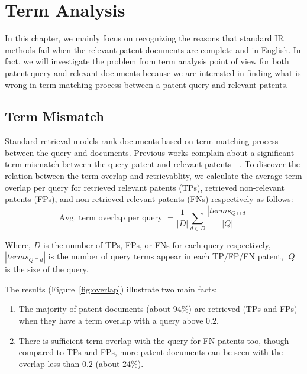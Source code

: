 \chapter{Term Analysis}
\label{cha:analysis}
In this chapter, we mainly focus on recognizing the reasons that standard IR methods fail when the relevant patent documents are complete and in English. In fact, we will investigate the problem from term analysis point of view for both patent query and relevant documents because we are interested in finding what is wrong in term matching process between a patent query and relevant patents. 


\section{Term Mismatch}
\label{sec:termmismatch}
%
Standard retrieval models rank documents based on term matching process between the query and documents. Previous works complain about a significant term mismatch between the query patent and relevant patents~\citep{roda2010clef}~\citep{magdy2012toward}. To discover the relation between the term overlap and retrievablity, we calculate the average term overlap per query for retrieved relevant patents (TPs), retrieved non-relevant patents (FPs), and non-retrieved relevant patents (FNs) respectively as follows:    
\begin{equation} 
\mbox{Avg. term overlap per query } = \frac{1}{|D|}\sum_{d\in D}\frac{|terms_{Q\cap d}|}{|Q|}
\label{eq:fntermoverlap}
\end{equation}

Where, $D$ is the number of TPs, FPs, or FNs for each query respectively, $ |terms_{Q\cap d}| $ is the number of query terms appear in each TP/FP/FN patent, $ |Q| $ is the size of the query.

The results (Figure~\ref{fig:overlap}) illustrate two main facts:
\begin{enumerate}
\item The majority of patent documents (about 94\%) are retrieved  (TPs and FPs) when they have a term overlap with a query above $ 0.2 $.
\item There is sufficient term overlap with the query for FN patents too, though compared to TPs and FPs, more patent documents can be seen with the overlap less than $ 0.2 $ (about 24\%).  
\end{enumerate}
 
